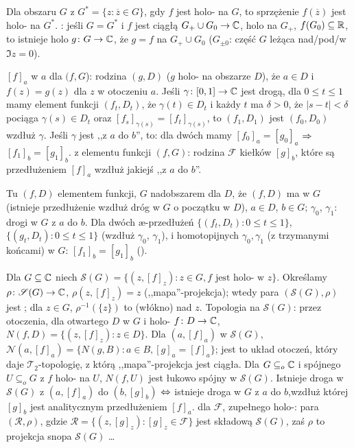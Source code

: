 Dla obszaru  $G$ z $G^* = \{ z : \overline z \in G\}$, gdy $f$ jest holo- na $G$, to sprzężenie $f(\overline z)$ jest holo- na $G^*$.
: jeśli $G = G^*$ i $f$ jest ciągłą $G_+ \cup G_0 \to \mathbb{C}$, holo na $G_+$, $f(G_0) \subseteq \mathbb{R}$, to istnieje holo $g \colon G \to \mathbb{C}$, że $g = f$ na $G_+ \cup G_0$ ($G_{\pm0}$: część $G$ leżąca nad/pod/w $\Im z  =0$).

  $[f]_a$ w $a$ dla $(f,G$): rodzina  $(g,D)$ ($g$ holo- na obszarze $D$), że $a \in D$ i $f(z) = g(z)$ dla $z$ w otoczeniu $a$.
Jeśli $\gamma \colon [0,1] \to \mathbb{C}$ jest drogą, dla $0 \le t \le 1$ mamy element funkcji $(f_t, D_t)$, że $\gamma(t) \in D_t$ i każdy $t$ ma $\delta > 0$, że $|s-t| < \delta$ pociąga $\gamma(s) \in D_t$ oraz $[f_s]_{\gamma(s)} = [f_t]_{\gamma(s)}$, to $(f_1, D_1)$ jest  $(f_0, D_0)$ wzdłuż $\gamma$.
Jeśli $\gamma$ jest ,,z $a$ do $b$'', to: dla dwóch mamy $[f_0]_a = [g_0]_a$ $\Rightarrow$ $[f_1]_b = [g_1]_b$.
 z elementu funkcji $(f,G)$: rodzina $\mathcal F$ kiełków $[g]_b$, które są przedłużeniem $[f]_a$ wzdłuż jakiejś ,,z $a$ do $b$''.

Tu  $(f,D)$ elementem funkcji, $G$ nadobszarem dla $D$, że $(f,D)$ ma  w $G$ (istnieje przedłużenie wzdłuż dróg w $G$ o początku w $D$), $a \in D$, $b \in G$; $\gamma_0$, $\gamma_1$: drogi w $G$ z $a$ do $b$.
Dla dwóch æ-przedłużeń $\{(f_t, D_t) : 0 \le t \le 1\}$, $\{(g_t, D_t) : 0 \le t \le 1\}$ (wzdłuż $\gamma_0$, $\gamma_1$), i homotopijnych $\gamma_0, \gamma_1$ (z trzymanymi końcami) w $G$: $[f_1]_b = [g_1]_b$ ().

Dla  $G \subseteq \mathbb{C}$ niech $\mathscr{S}(G) = \{(z, [f]_z) : z \in G, f \textrm{ jest holo- w } z\}$.
Określamy $\rho \colon \mathscr S (G) \to \mathbb{C}$, $\rho(z, [f]_z) = z$ (,,mapa''-projekcja); wtedy para $(\mathscr S(G), \rho)$ jest ; dla $z \in G$, $\rho^{-1}(\{z\})$ to  (włókno) nad $z$.
Topologia na $\mathscr S(G)$: przez otoczenia, dla otwartego $D$ w $G$ i holo- $f \colon D \to \mathbb{C}$, $N(f,D) = \{(z, [f]_z) : z \in D\}$.
Dla $(a, [f]_a)$ w $\mathscr S(G)$, $\mathcal N(a, [f]_a) = \{N(g,B) : a \in B, [g]_a = [f]_a\}$; jest to układ otoczeń, który daje $\mathcal T_2$-topologię, z którą ,,mapa''-projekcja jest ciągła.
Dla $G \subseteq_o \mathbb{C}$ i spójnego $U \subseteq_o G$ z $f$ holo- na $U$, $N(f,U)$ jest łukowo spójny w $\mathscr S(G)$.
Istnieje droga w $\mathscr S(G)$ z $(a, [f]_a)$ do $(b, [g]_b)$ $\Leftrightarrow$ istnieje droga w $G$ z $a$ do $b$,wzdłuż której $[g]_b$ jest analitycznym przedłużeniem $[f]_a$.
 dla $\mathcal F$, zupełnego holo-: para $(\mathscr R, \rho)$, gdzie $\mathscr R = \{(z, [g]_z) : [g]_z \in \mathcal F\}$ jest składową $\mathscr S(G)$, zaś $\rho$ to projekcja snopa $\mathscr S(G)$ \dots

